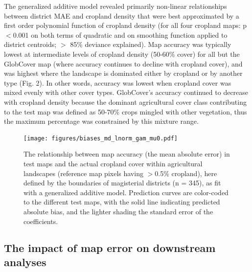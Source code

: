 \documentclass[a4paper]{article}
\begin{document}
The generalized additive model revealed primarily non-linear relationships between district MAE and cropland density that were best approximated by a first order polynomial function of cropland density (for all four cropland maps: p$<$0.001 on both terms of quadratic and on smoothing function applied to district centroids; $>$ 85\% deviance explained). Map accuracy was typically lowest at intermediate levels of cropland density (50-60\% cover) for all but the GlobCover map (where accuracy continues to decline with cropland cover), and was highest where the landscape is dominated either by cropland or by another type (Fig. 2). In other words, accuracy was lowest when cropland cover was mixed evenly with other cover types. GlobCover's accuracy continued to decrease with cropland density because the dominant agricultural cover class contributing to the test map was defined as 50-70\% crops mingled with other vegetation, thus the maximum percentage was constrained by this mixture range.  

\begin{figure}[!h]
\centerline{\texttt{[image: figures/biases\_md\_lnorm\_gam\_mu0.pdf]}}
\caption{The relationship between map accuracy (the mean absolute error) in test maps and the actual cropland cover within agricultural landscapes (reference map pixels having $>$0.5\% cropland), here defined by the boundaries of magisterial districts (n = 345), as fit with a generalized additive model. Prediction curves are color-coded to the different test maps, with the solid line indicating predicted absolute bias, and the lighter shading the standard error of the coefficients.}\label{afoto2}
\end{figure}


\vspace{-0.3 cm}
\subsection*{The impact of map error on downstream analyses}
\vspace{-0.2 cm}
\end{document}
